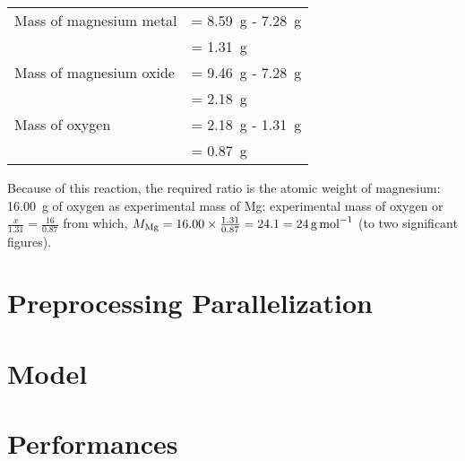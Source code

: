 \documentclass[
	letterpaper, %
	10pt, %
]{class}
\begin{document}
\begin{tabular}{ll}
	Mass of magnesium metal & = \SI{8.59}{\gram} - \SI{7.28}{\gram} \\
	                        & = \SI{1.31}{\gram}                    \\
	Mass of magnesium oxide & = \SI{9.46}{\gram} - \SI{7.28}{\gram} \\
	                        & = \SI{2.18}{\gram}                    \\
	Mass of oxygen          & = \SI{2.18}{\gram} - \SI{1.31}{\gram} \\
	                        & = \SI{0.87}{\gram}
\end{tabular}

Because of this reaction, the required ratio is the atomic weight of magnesium: \SI{16.00}{\gram} of oxygen as experimental mass of Mg: experimental mass of oxygen or $\frac{x}{1.31} = \frac{16}{0.87}$ from which, $M_{\ce{Mg}} = 16.00 \times \frac{1.31}{0.87} = 24.1 = \SI{24}{\gram\per\mole}$ (to two significant figures).


\section{Preprocessing Parallelization}


\section{Model}


\section{Performances}

\end{document}
